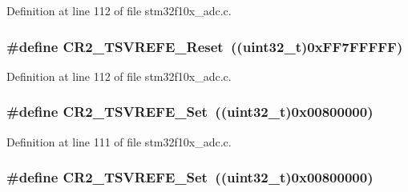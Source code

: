 Definition at line 112 of file stm32f10x\+\_\+adc.\+c.

\subsubsection[{\texorpdfstring{C\+R2\+\_\+\+T\+S\+V\+R\+E\+F\+E\+\_\+\+Reset}{CR2_TSVREFE_Reset}}]{\setlength{\rightskip}{0pt plus 5cm}\#define C\+R2\+\_\+\+T\+S\+V\+R\+E\+F\+E\+\_\+\+Reset~(({\bf uint32\+\_\+t})0x\+F\+F7\+F\+F\+F\+F\+F)}\hypertarget{group___a_d_c___private___defines_gaa207bc0eeed8b546dc9536b02df633b5}{}\label{group___a_d_c___private___defines_gaa207bc0eeed8b546dc9536b02df633b5}


Definition at line 112 of file stm32f10x\+\_\+adc.\+c.

\subsubsection[{\texorpdfstring{C\+R2\+\_\+\+T\+S\+V\+R\+E\+F\+E\+\_\+\+Set}{CR2_TSVREFE_Set}}]{\setlength{\rightskip}{0pt plus 5cm}\#define C\+R2\+\_\+\+T\+S\+V\+R\+E\+F\+E\+\_\+\+Set~(({\bf uint32\+\_\+t})0x00800000)}\hypertarget{group___a_d_c___private___defines_ga7f5e0f807edebbfcef4883f3ec42b9e8}{}\label{group___a_d_c___private___defines_ga7f5e0f807edebbfcef4883f3ec42b9e8}


Definition at line 111 of file stm32f10x\+\_\+adc.\+c.

\subsubsection[{\texorpdfstring{C\+R2\+\_\+\+T\+S\+V\+R\+E\+F\+E\+\_\+\+Set}{CR2_TSVREFE_Set}}]{\setlength{\rightskip}{0pt plus 5cm}\#define C\+R2\+\_\+\+T\+S\+V\+R\+E\+F\+E\+\_\+\+Set~(({\bf uint32\+\_\+t})0x00800000)}\hypertarget{group___a_d_c___private___defines_ga7f5e0f807edebbfcef4883f3ec42b9e8}{}\label{group___a_d_c___private___defines_ga7f5e0f807edebbfcef4883f3ec42b9e8}


